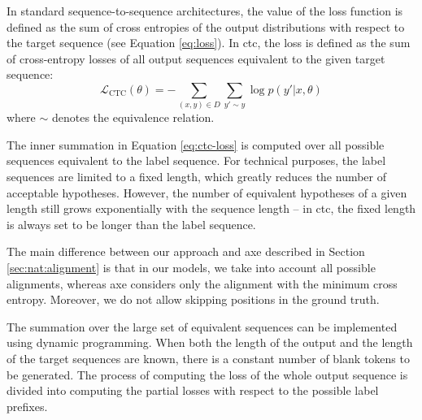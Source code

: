 In standard sequence-to-sequence architectures, the value of the loss function
is defined as the sum of cross entropies of the output distributions with
respect to the target sequence (see Equation \ref{eq:loss}). In \ac{ctc}, the
loss is defined as the sum of cross-entropy losses of all output sequences
equivalent to the given target sequence:
%
\begin{equation}
  \mathcal{L}_{\text{CTC}}({\theta}) = - \sum_{(x, y) \in D} \sum_{y' \sim y}  \log p(y' | x, \theta)
  \label{eq:ctc-loss}
\end{equation}
%
where $\sim$ denotes the equivalence relation. %

The inner summation in Equation \ref{eq:ctc-loss} is computed over all possible
sequences equivalent to the label sequence. For technical purposes, the label
sequences are limited to a fixed length, which greatly reduces the number of
acceptable hypotheses. However, the number of equivalent hypotheses of a given
length still grows exponentially with the sequence length -- in \ac{ctc}, the
fixed length is always set to be longer than the label sequence.

The main difference between our approach and \ac{axe} described in Section
\ref{sec:nat:alignment} is that in our models, we take into account all
possible alignments, whereas \ac{axe} considers only the alignment with the
minimum cross entropy. Moreover, we do not allow skipping positions in the
ground truth.

The summation over the large set of equivalent sequences can be implemented
using dynamic programming. When both the length of the output and the length of
the target sequences are known, there is a constant number of blank tokens to
be generated. The process of computing the loss of the whole output sequence is
divided into computing the partial losses with respect to the possible label
prefixes.

